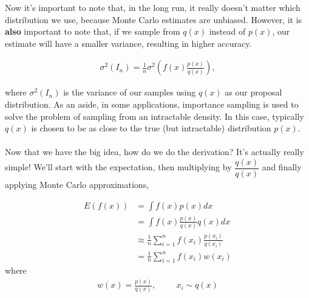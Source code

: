 \documentclass[10pt,a4paper]{article}
\begin{document}
\pagebreak 

\indent Now it's important to note that, in the long run, it really doesn't matter which distribution we use, because Monte Carlo estimates are unbiased. However, it is \textbf{also} important to note that, if we sample from $q(x)$ instead of $p(x)$, our estimate will have a smaller variance, resulting in higher accuracy. 

\begin{align*}
\sigma^2(I_n) = \frac{1}{n} \sigma^2(f(x)\frac{p(x)}{q(x)}) ,
\end{align*}

\indent where $\sigma^2(I_n)$ is the variance of our samples using $q(x)$ as our proposal distribution. As an aside, in some applications, importance sampling is used to solve the problem of sampling from an intractable density. In this case, typically $q(x)$ is chosen to be as close to the true (but intractable) distribution $p(x)$.\\
\\
\indent Now that we have the big idea, how do we do the derivation? It's actually really simple! We'll start with the expectation, then multiplying by $\dfrac{q(x)}{q(x)}$ and finally applying Monte Carlo approximations, 

\begin{align*}
E(f(x)) &= \int f(x)p(x)dx\\
		&= \int f(x)\frac{p(x)}{q(x)}q(x)dx\\
		&\approx \frac{1}{n} \sum_{i=1}^n f(x_i)\frac{p(x_i)}{q(x_i)}\\
		&= \frac{1}{n}\sum_{i=1}^n f(x_i)w(x_i)
\end{align*}
where
\begin{align*}
w(x)=\frac{p(x)}{q(x)}, \hspace{1cm} x_i \sim q(x)
\end{align*}


\pagebreak
\end{document}
